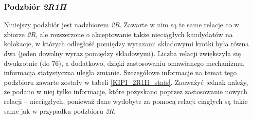\subsubsection{Podzbiór \protect\textit{2R1H}}
Niniejszy podzbiór jest nadzbiorem \emph{2R}.
Zawarte w nim są te same relacje co w zbiorze \emph{2R}, ale rozszerzone o akceptowanie także nieciągłych kandydatów na kolokacje, w których odległość pomiędzy wyrazami składowymi krotki była równa dwa (jeden dowolny wyraz pomiędzy składowymi).
Liczba relacji zwiększyła się dwukrotnie (do 76), a dodatkowo, dzięki zastosowaniu omawianego mechanizmu, informacja statystyczna uległa zmianie.
Szczegółowe informacje na temat tego podzbioru zawarte zostały w tabeli \ref{KIPI_2R1H_stats}.
Zauważyć jednak należy, że podano w niej tylko informacje, które pozyskano poprzez zastosowanie nowych relacji -- nieciągłych, ponieważ dane wydobyte za pomocą relacji ciągłych są takie same jak w przypadku podzbioru \emph{2R}.

